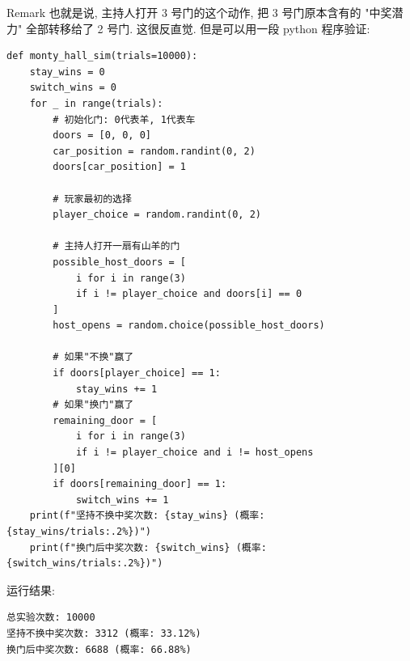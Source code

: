 \documentclass{qlnotes-export}
\begin{document}
\begin{example}
\begin{qlremark}{Remark}
也就是说, 主持人打开 3 号门的这个动作, 把 3 号门原本含有的 "中奖潜力" 全部转移给了 2 号门. 这很反直觉. 但是可以用一段 python 程序验证:

\begin{verbatim}
def monty_hall_sim(trials=10000):
    stay_wins = 0
    switch_wins = 0
    for _ in range(trials):
        # 初始化门: 0代表羊, 1代表车
        doors = [0, 0, 0]
        car_position = random.randint(0, 2)
        doors[car_position] = 1

        # 玩家最初的选择
        player_choice = random.randint(0, 2)

        # 主持人打开一扇有山羊的门
        possible_host_doors = [
            i for i in range(3)
            if i != player_choice and doors[i] == 0
        ]
        host_opens = random.choice(possible_host_doors)

        # 如果"不换"赢了
        if doors[player_choice] == 1:
            stay_wins += 1
        # 如果"换门"赢了
        remaining_door = [
            i for i in range(3)
            if i != player_choice and i != host_opens
        ][0]
        if doors[remaining_door] == 1:
            switch_wins += 1
    print(f"坚持不换中奖次数: {stay_wins} (概率: {stay_wins/trials:.2%})")
    print(f"换门后中奖次数: {switch_wins} (概率: {switch_wins/trials:.2%})")
\end{verbatim}

运行结果:

\begin{verbatim}
总实验次数: 10000
坚持不换中奖次数: 3312 (概率: 33.12%)
换门后中奖次数: 6688 (概率: 66.88%)
\end{verbatim}

\end{qlremark}

\end{example}
\end{document}
